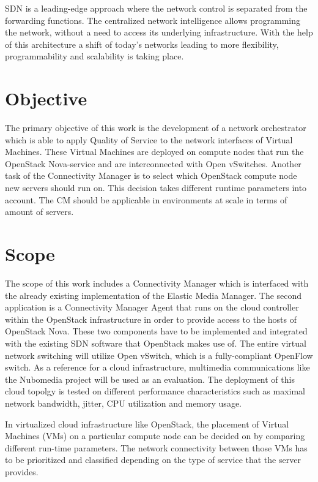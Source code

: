 SDN is a leading-edge approach where the network control is separated from the forwarding functions. The centralized network intelligence allows programming the network, without a need to access its underlying infrastructure. With the help of this architecture a shift of today's networks leading to more flexibility, programmability and scalability is taking place.

\section{Objective}

The primary objective of this work is the development of a network orchestrator which is able to apply Quality of Service to the network interfaces of Virtual Machines. These Virtual Machines are deployed on compute nodes that run the OpenStack Nova-service and are interconnected with Open vSwitches. Another task of the Connectivity Manager is to select which OpenStack compute node new servers should run on. This decision takes different runtime parameters into account. The CM should be applicable in environments at scale in terms of amount of servers.

\section{Scope}
The scope of this work includes a Connectivity Manager which is interfaced with the already existing implementation of the Elastic Media Manager. The second application is a Connectivity Manager Agent that runs on the cloud controller within the OpenStack infrastructure in order to provide access to the hosts of OpenStack Nova. These two components have to be implemented and integrated with the existing SDN software that OpenStack makes use of. The entire virtual network switching will utilize Open vSwitch, which is a fully-compliant OpenFlow switch. As a reference for a cloud infrastructure, multimedia communications like the Nubomedia project will be used as an evaluation. The deployment of this cloud topolgy is tested on different performance characteristics such as maximal network bandwidth, jitter, CPU utilization and memory usage.

In virtualized cloud infrastructure like OpenStack, the placement of Virtual Machines (VMs) on a particular compute node can be decided on by comparing different run-time parameters. The network connectivity between those VMs has to be prioritized and classified depending on the type of service that the server provides.

